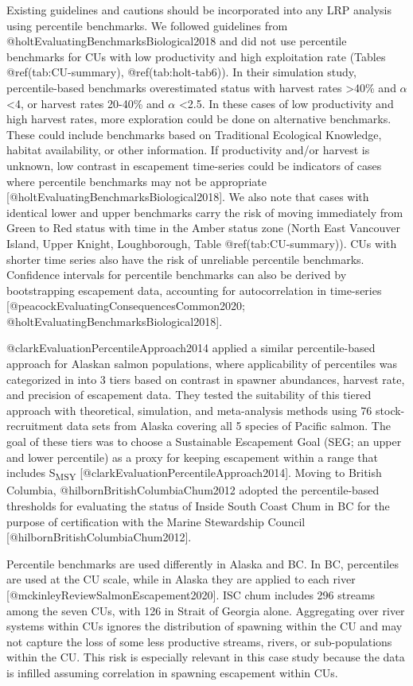 \documentclass[
]{article}
\begin{document}
Existing guidelines and cautions should be incorporated into any LRP
analysis using percentile benchmarks. We followed guidelines from
@holtEvaluatingBenchmarksBiological2018 and did not use percentile
benchmarks for CUs with low productivity and high exploitation rate
(Tables @ref(tab:CU-summary), @ref(tab:holt-tab6)). In their simulation
study, percentile-based benchmarks overestimated status with harvest
rates \textgreater40\% and \(\alpha\) \textless4, or harvest rates
20-40\% and \(\alpha\) \textless2.5. In these cases of low productivity
and high harvest rates, more exploration could be done on alternative
benchmarks. These could include benchmarks based on Traditional
Ecological Knowledge, habitat availability, or other information. If
productivity and/or harvest is unknown, low contrast in escapement
time-series could be indicators of cases where percentile benchmarks may
not be appropriate {[}@holtEvaluatingBenchmarksBiological2018{]}. We
also note that cases with identical lower and upper benchmarks carry the
risk of moving immediately from Green to Red status with time in the
Amber status zone (North East Vancouver Island, Upper Knight,
Loughborough, Table @ref(tab:CU-summary)). CUs with shorter time series
also have the risk of unreliable percentile benchmarks. Confidence
intervals for percentile benchmarks can also be derived by bootstrapping
escapement data, accounting for autocorrelation in time-series
{[}@peacockEvaluatingConsequencesCommon2020;
@holtEvaluatingBenchmarksBiological2018{]}.

@clarkEvaluationPercentileApproach2014 applied a similar
percentile-based approach for Alaskan salmon populations, where
applicability of percentiles was categorized in into 3 tiers based on
contrast in spawner abundances, harvest rate, and precision of
escapement data. They tested the suitability of this tiered approach
with theoretical, simulation, and meta-analysis methods using 76
stock-recruitment data sets from Alaska covering all 5 species of
Pacific salmon. The goal of these tiers was to choose a Sustainable
Escapement Goal (SEG; an upper and lower percentile) as a proxy for
keeping escapement within a range that includes S\textsubscript{MSY}
{[}@clarkEvaluationPercentileApproach2014{]}. Moving to British
Columbia, @hilbornBritishColumbiaChum2012 adopted the percentile-based
thresholds for evaluating the status of Inside South Coast Chum in BC
for the purpose of certification with the Marine Stewardship Council
{[}@hilbornBritishColumbiaChum2012{]}.

Percentile benchmarks are used differently in Alaska and BC. In BC,
percentiles are used at the CU scale, while in Alaska they are applied
to each river {[}@mckinleyReviewSalmonEscapement2020{]}. ISC chum
includes 296 streams among the seven CUs, with 126 in Strait of Georgia
alone. Aggregating over river systems within CUs ignores the
distribution of spawning within the CU and may not capture the loss of
some less productive streams, rivers, or sub-populations within the CU.
This risk is especially relevant in this case study because the data is
infilled assuming correlation in spawning escapement within CUs.
\end{document}
